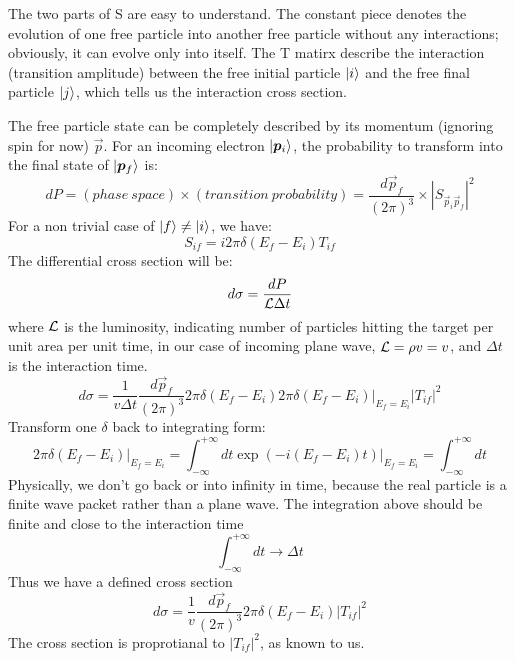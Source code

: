 The two parts of S are easy to understand.
The constant piece denotes the evolution of one free particle into another free
particle without any interactions; obviously, it can evolve only into itself.
The T matirx describe the interaction (transition amplitude) between the free
initial particle $\ket{i}$ and the free final particle $\ket{j}$, which tells
us the interaction cross section.

The free particle state can be completely described by its momentum (ignoring spin
for now) $\vec{p}$. For an incoming electron $\ket{\boldsymbol{p}_i}$, the probability
to transform into the final state of $\ket{\boldsymbol{p}_f}$ is:
\begin{equation}
    dP = (phase\ space) \times (transition\ probability) = \frac{d\vec{p}_f}{(2\pi)^3} \times |S_{\vec{p}_i\vec{p}_f}|^2
\end{equation}
For a non trivial case of $\ket{f} \ne \ket{i}$, we have:
\begin{equation}
    S_{if} = i2\pi \delta(E_f - E_i)T_{if}
\end{equation}
The differential cross section will be:
\begin{equation}
    d\sigma = \frac{dP}{\mathcal{L} \Delta t}
\end{equation}
where $\mathcal{L}$ is the luminosity, indicating number of particles hitting 
the target per unit area per unit time, in our case of incoming plane wave, 
$\mathcal{L} = \rho v = v$, and $\Delta t$ is the interaction time.
\begin{equation}
    d\sigma = \frac{1}{v\Delta t} \frac{d\vec{p}_f}{(2\pi)^3} 2\pi\delta(E_f - E_i) \left. 2\pi\delta(E_f - E_i)\right|_{E_f = E_i} |T_{if}|^2
\end{equation}
Transform one $\delta$ back to integrating form: 
\begin{equation}
    \left. 2\pi\delta(E_f - E_i) \right|_{E_f = E_i} 
    = \int_{-\infty}^{+\infty} dt \left.\exp(-i(E_f - E_i)t)\right|_{E_f = E_i}
    = \int_{-\infty}^{+\infty} dt 
\end{equation}
Physically, we don't go back or into infinity in time, because the real particle
is a finite wave packet rather than a plane wave. The integration above should 
be finite and close to the interaction time
\begin{equation}
    \int_{-\infty}^{+\infty} dt \rightarrow \Delta t
\end{equation}
Thus we have a defined cross section
\begin{equation}
    d\sigma = \frac{1}{v} \frac{d\vec{p}_f}{(2\pi)^3} 2\pi\delta(E_f - E_i) |T_{if}|^2
\end{equation}
The cross section is proprotianal to $|T_{if}|^2$, as known to us.


